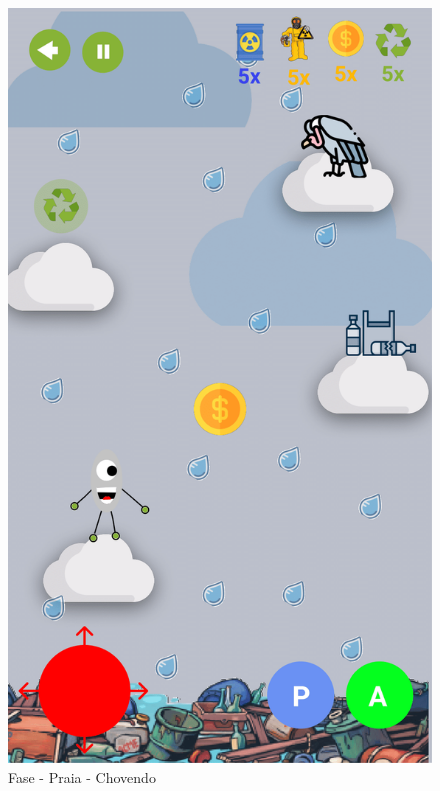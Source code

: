\documentclass[]{scrartcl}
\begin{document}
\begin{figure}[H]
	\begin{center}
		\includegraphics[scale=0.3]{figs/Game Design-11.png}
		\caption{Fase - Praia - Chovendo}
	\end{center}
\end{figure}
\end{document}
